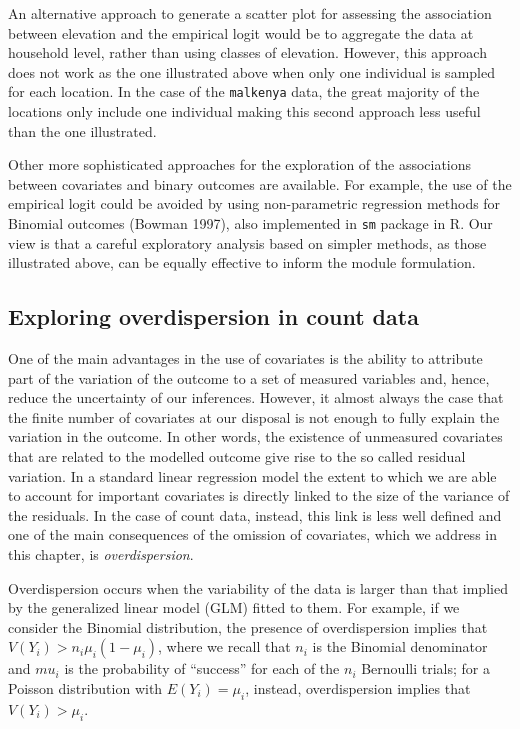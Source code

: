 \documentclass[
  letterpaper,
]{krantz}
\begin{document}
An alternative approach to generate a scatter plot for assessing the
association between elevation and the empirical logit would be to
aggregate the data at household level, rather than using classes of
elevation. However, this approach does not work as the one illustrated
above when only one individual is sampled for each location. In the case
of the \texttt{malkenya} data, the great majority of the locations only
include one individual making this second approach less useful than the
one illustrated.

Other more sophisticated approaches for the exploration of the
associations between covariates and binary outcomes are available. For
example, the use of the empirical logit could be avoided by using
non-parametric regression methods for Binomial outcomes (Bowman 1997),
also implemented in \texttt{sm} package in R. Our view is that a careful
exploratory analysis based on simpler methods, as those illustrated
above, can be equally effective to inform the module formulation.

\hypertarget{exploring-overdispersion-in-count-data}{%
\subsection{Exploring overdispersion in count
data}\label{exploring-overdispersion-in-count-data}}

One of the main advantages in the use of covariates is the ability to
attribute part of the variation of the outcome to a set of measured
variables and, hence, reduce the uncertainty of our inferences. However,
it almost always the case that the finite number of covariates at our
disposal is not enough to fully explain the variation in the outcome. In
other words, the existence of unmeasured covariates that are related to
the modelled outcome give rise to the so called residual variation. In a
standard linear regression model the extent to which we are able to
account for important covariates is directly linked to the size of the
variance of the residuals. In the case of count data, instead, this link
is less well defined and one of the main consequences of the omission of
covariates, which we address in this chapter, is \emph{overdispersion}.

Overdispersion occurs when the variability of the data is larger than
that implied by the generalized linear model (GLM) fitted to them. For
example, if we consider the Binomial distribution, the presence of
overdispersion implies that \(V(Y_i) > n_i \mu_{i}(1-\mu_i)\), where we
recall that \(n_i\) is the Binomial denominator and \(mu_i\) is the
probability of ``success'' for each of the \(n_i\) Bernoulli trials; for
a Poisson distribution with \(E(Y_i) = \mu_i\), instead, overdispersion
implies that \(V(Y_i) > \mu_{i}\).
\end{document}
